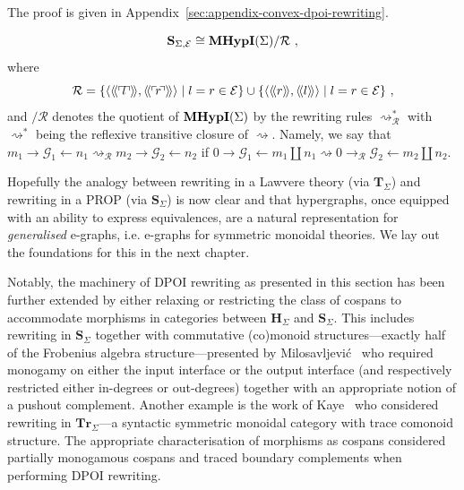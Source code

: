 The proof is given in Appendix~\ref{sec:appendix-convex-dpoi-rewriting}.

\begin{corollary}
\[
\mathbf{S}_{\Sigma, \mathcal{E}} \cong \mathbf{MHypI}(\Sigma) / \mathcal{R}~,
\]
where
\[
\mathcal{R} = \{ \langle \llangle \corner{l} \rrangle, \llangle \corner{r} \rrangle \rangle \mid l = r \in \mathcal{E} \} \cup \{ \langle \llangle r \rrangle, \llangle l \rrangle \rangle \mid l = r \in \mathcal{E}\}~,
\]
and $/ \mathcal{R}$ denotes the quotient of $\mathbf{MHypI}(\Sigma)$ by the rewriting rules $\rightsquigarrow_\mathcal{R}^{*}$ with $\rightsquigarrow^{*}$ being the reflexive transitive closure of $\rightsquigarrow$.
Namely, we say that $m_1 \xrightarrow{} \mathcal{G}_1 \xleftarrow{} n_1 \rightsquigarrow_{\mathcal{R}} m_2 \xrightarrow{} \mathcal{G}_2 \xleftarrow{} n_2$ if $0 \xrightarrow{} \mathcal{G}_1 \xleftarrow{} m_1 \coprod n_1 \rightsquigarrow 0 \xrightarrow{}_{\mathcal{R}} \mathcal{G}_2 \xleftarrow{} m_2 \coprod n_2$.
\end{corollary}

Hopefully the analogy between rewriting in a Lawvere theory (via $\mathbf{T}_{\Sigma}$) and rewriting in a PROP (via $\mathbf{S}_{\Sigma}$) is now clear and that hypergraphs, once equipped with an ability to express equivalences, are a natural representation for \emph{generalised} e-graphs, i.e. e-graphs for symmetric monoidal theories.
We lay out the foundations for this in the next chapter.

Notably, the machinery of DPOI rewriting as presented in this section has been further extended by either relaxing or restricting the class of cospans to accommodate morphisms in categories between $\mathbf{H}_{\Sigma}$ and $\mathbf{S}_{\Sigma}$.
This includes rewriting in $\mathbf{S}_{\Sigma}$ together with commutative (co)monoid structures---exactly half of the Frobenius algebra structure---presented by Milosavljevi\'{c}~\cite{zanassi_comonoid} who required monogamy on either the input interface or the output interface (and respectively restricted either in-degrees or out-degrees) together with an appropriate notion of a pushout complement.
Another example is the work of Kaye~\cite{ghica_rewriting_2023} who considered rewriting in $\mathbf{Tr}_{\Sigma}$---a syntactic symmetric monoidal category with trace comonoid structure.
The appropriate characterisation of morphisms as cospans considered partially monogamous cospans and traced boundary complements when performing DPOI rewriting.
